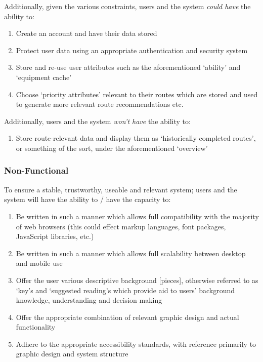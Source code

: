 \documentclass[11pt, english]{article}
\begin{document}
	Additionally, given the various constraints, users and the system \textit{could have} the ability to:

	\begin{enumerate}
	\setlength\itemsep{0cm}
		\item Create an account and have their data stored
		\item Protect user data using an appropriate authentication and security system
		\item Store and re-use user attributes such as the aforementioned `ability' and `equipment cache'
		\item Choose `priority attributes' relevant to their routes which are stored and used to generate more relevant route recommendations etc.
	\end{enumerate}

	Additionally, users and the system \textit{won't have} the ability to:

	\begin{enumerate}
	\setlength\itemsep{0cm}
		\item Store route-relevant data and display them as `historically completed routes', or something of the sort, under the aforementioned `overview'
	\end{enumerate}

		\subsubsection{Non-Functional}

	To ensure a stable, trustworthy, useable and relevant system; users and the system will have the ability to / have the capacity to:

	\begin{enumerate}
	\setlength\itemsep{0cm}
		\item Be written in such a manner which allows full compatibility with the majority of web browsers (this could effect markup languages, font packages, JavaScript libraries, etc.)
		\item Be written in such a manner which allows full scalability between desktop and mobile use
		\item Offer the user various descriptive background [pieces], otherwise referred to as `key's and `suggested reading's which provide aid to users' background knowledge, understanding and decision making
		\item Offer the appropriate combination of relevant graphic design and actual functionality
		\item Adhere to the appropriate accessibility standards, with reference primarily to graphic design and system structure
	\end{enumerate}
\end{document}
